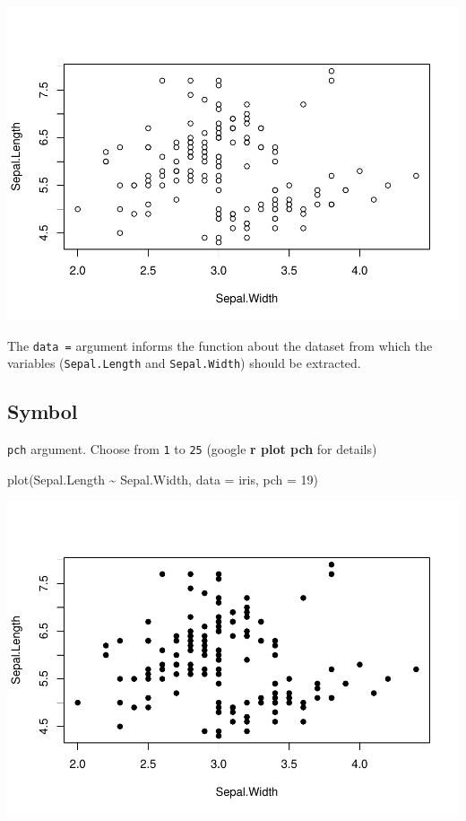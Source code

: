 \documentclass[
]{book}
\newenvironment{Shaded}{\begin{snugshade}}{\end{snugshade}}
\newcommand{\AttributeTok}[1]{\textcolor[rgb]{0.77,0.63,0.00}{#1}}
\newcommand{\DecValTok}[1]{\textcolor[rgb]{0.00,0.00,0.81}{#1}}
\newcommand{\FunctionTok}[1]{\textcolor[rgb]{0.00,0.00,0.00}{#1}}
\newcommand{\NormalTok}[1]{#1}
\newcommand{\SpecialCharTok}[1]{\textcolor[rgb]{0.00,0.00,0.00}{#1}}
\begin{document}
\begin{center}\includegraphics{_main_files/figure-latex/unnamed-chunk-116-1} \end{center}

The \texttt{data\ =} argument informs the function about the dataset from which the variables (\texttt{Sepal.Length} and \texttt{Sepal.Width}) should be extracted.

\hypertarget{symbol}{%
\subsection{Symbol}\label{symbol}}

\texttt{pch} argument. Choose from \texttt{1} to \texttt{25} (google \textbf{r plot pch} for details)

\begin{Shaded}
\begin{Highlighting}[]
\FunctionTok{plot}\NormalTok{(Sepal.Length }\SpecialCharTok{\textasciitilde{}}\NormalTok{ Sepal.Width, }\AttributeTok{data =}\NormalTok{ iris,}
     \AttributeTok{pch =} \DecValTok{19}\NormalTok{)}
\end{Highlighting}
\end{Shaded}

\begin{center}\includegraphics{_main_files/figure-latex/unnamed-chunk-117-1} \end{center}
\end{document}
